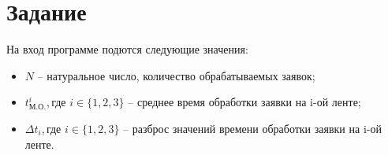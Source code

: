 \chapter*{Задание}

На вход программе подются следующие значения:

\begin{itemize}
    \item $N$ -- натуральное число, количество обрабатываемых заявок;
    \item $t_{\text{М}.\text{О}.}^{i}, \text{где } i \in \{1, 2, 3\}$ --
        среднее время обработки заявки на i-ой ленте;
    \item $\Delta t_i, \text{где } i \in \{1, 2, 3\}$ -- разброс значений
        времени обработки заявки на i-ой ленте.
\end{itemize}

